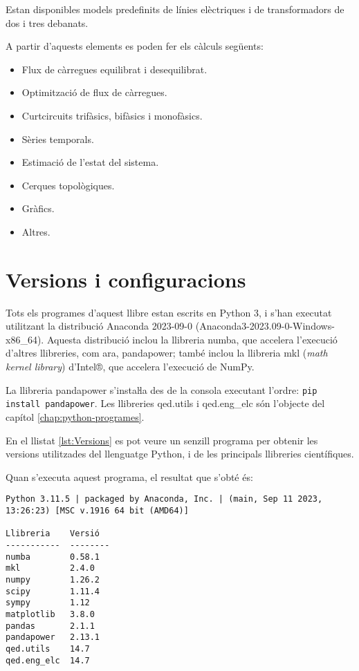 Estan disponibles models predefinits de línies elèctriques i de transformadors de dos i tres debanats.

A partir d'aquests elements  es poden fer els càlculs següents:
\begin{itemize}
	\item Flux de càrregues equilibrat i desequilibrat.
	\item Optimització de flux de càrregues.
	\item Curtcircuits trifàsics, bifàsics i monofàsics.
	\item Sèries temporals.
	\item Estimació de l'estat del sistema.
	\item Cerques topològiques.
	\item Gràfics.
	\item Altres.
\end{itemize}


\section{Versions i configuracions}\label{sec:python-versions}

Tots els programes d'aquest llibre estan escrits en Python 3, i s'han executat utilitzant la distribució Anaconda 2023-09-0 (Anaconda3-2023.09-0-Windows-x86\_64). Aquesta distribució inclou la llibreria numba, que accelera l'execució d'altres llibreries, com ara, pandapower; també inclou la llibreria mkl (\textit{math kernel library})  d'Intel®, que accelera l'execució de NumPy.

La llibreria pandapower s'instaŀla des de la consola executant   l'ordre: \texttt{pip install pandapower}. Les llibreries qed.utils i qed.eng\_elc són l'objecte del capítol \ref{chap:python-programes}. 

En el llistat \vref{lst:Versions} es pot veure un senzill programa per obtenir les versions utilitzades  del llenguatge Python, i de les  principals llibreries científiques.


Quan s'executa aquest programa, el resultat que s'obté és:
\lstset{
	language=,
	numbers=none,
	frame=none
}

\begin{lstlisting}
Python 3.11.5 | packaged by Anaconda, Inc. | (main, Sep 11 2023, 13:26:23) [MSC v.1916 64 bit (AMD64)]

Llibreria    Versió
-----------  --------
numba        0.58.1
mkl          2.4.0
numpy        1.26.2
scipy        1.11.4
sympy        1.12
matplotlib   3.8.0
pandas       2.1.1
pandapower   2.13.1
qed.utils    14.7
qed.eng_elc  14.7


\end{lstlisting} 


